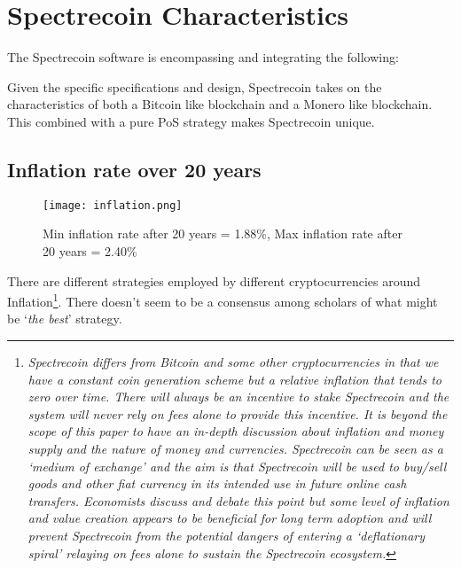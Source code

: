 \section{Spectrecoin Characteristics}
The Spectrecoin software is encompassing and integrating the following:

\begin{table}[h]
\end{table}
\noindent
Given the specific specifications and design, Spectrecoin takes on the characteristics of both a Bitcoin like blockchain and a Monero like blockchain. This combined with a pure PoS strategy makes Spectrecoin unique.

\subsection{Inflation rate over 20 years}
\begin{figure}[h]
	\centering
	\texttt{[image: inflation.png]}
	\caption{Min inflation rate after 20 years = 1.88\%, Max inflation 
	rate after 20 years = 2.40\% }
\end{figure}
\noindent
There are different strategies employed by different cryptocurrencies around 
Inflation\footnote{\textit{Spectrecoin differs from Bitcoin and some other 
cryptocurrencies in that we have a constant coin generation scheme 
but a relative inflation that tends to zero over time. There will 
always be an incentive to stake Spectrecoin and the system will never 
rely on fees alone to provide this incentive. It is beyond the scope 
of this paper to have an in-depth discussion about inflation and money 
supply and the nature of money and currencies. Spectrecoin can be seen 
as a ‘medium of exchange’ and the aim is that Spectrecoin will be used 
to buy/sell goods and other fiat currency in its intended use in future 
online cash transfers. Economists discuss and debate this point but some 
level of inflation and value creation appears to be beneficial for long 
term adoption and will prevent Spectrecoin from the potential dangers of 
entering a ‘deflationary spiral’ relaying on fees alone to sustain the 
Spectrecoin ecosystem.}}. There doesn’t seem to be a consensus among 
scholars of what might be ‘\textit{the best}’ strategy.
\newpage

